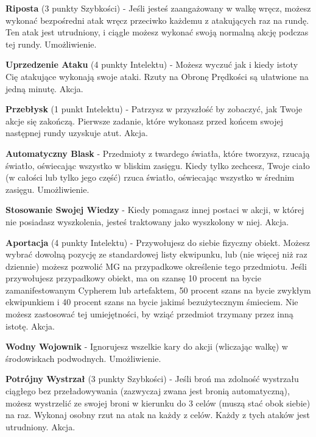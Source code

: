 \textbf{Riposta}\label{sec:Riposta} (3 punkty Szybkości) - Jeśli jesteś zaangażowany w walkę wręcz, możesz wykonać bezpośredni atak wręcz przeciwko każdemu z atakujących raz na rundę. Ten atak jest utrudniony, i ciągle możesz wykonać swoją normalną akcję podczas tej rundy. Umożliwienie.

\textbf{Uprzedzenie Ataku}\label{sec:Uprzedzenie Ataku} (4 punkty Intelektu) - Możesz wyczuć jak i kiedy istoty Cię atakujące wykonają swoje ataki. Rzuty na Obronę Prędkości są ułatwione na jedną minutę. Akcja.

\textbf{Przebłysk}\label{sec:Przebłysk} (1 punkt Intelektu) - Patrzysz w przyszłość by zobaczyć, jak Twoje akcje się zakończą. Pierwsze zadanie, które wykonasz przed końcem swojej następnej rundy uzyskuje atut. Akcja.

\textbf{Automatyczny Blask}\label{sec:Automatyczny Blask} - Przedmioty z twardego światła, które tworzysz, rzucają światło, oświecając wszystko w bliskim zasięgu. Kiedy tylko zechcesz, Twoje ciało (w całości lub tylko jego część) rzuca światło, oświecając wszystko w średnim zasięgu. Umożliwienie. 

\textbf{Stosowanie Swojej Wiedzy}\label{sec:Stosowanie Swojej Wiedzy} - Kiedy pomagasz innej postaci w akcji, w której nie posiadasz wyszkolenia, jesteś traktowany jako wyszkolony w niej. Akcja.

\textbf{Aportacja}\label{sec:Aportacja} (4 punkty Intelektu) - Przywołujesz do siebie fizyczny obiekt. Możesz wybrać dowolną pozycję ze standardowej listy ekwipunku, lub (nie więcej niż raz dziennie) możesz pozwolić MG na przypadkowe określenie tego przedmiotu. Jeśli przywołujesz przypadkowy obiekt, ma on szansę 10 procent na bycie zamanifestowanym Cypherem lub artefaktem, 50 procent szans na bycie zwykłym ekwipunkiem i 40 procent szans na bycie jakimś bezużytecznym śmieciem. Nie możesz zastosować tej umiejętności, by wziąć przedmiot trzymany przez inną istotę. Akcja.

\textbf{Wodny Wojownik}\label{sec:Wodny Wojownik} - Ignorujesz wszelkie kary do akcji (wliczając walkę) w środowiskach podwodnych. Umożliwienie. 

\textbf{Potrójny Wystrzał}\label{sec:Potrójny Wystrzał} (3 punkty Szybkości) - Jeśli broń ma zdolność wystrzału ciągłego bez przeładowywania (zazwyczaj zwana jest bronią automatyczną), możesz wystrzelić ze swojej broni w kierunku do 3 celów (muszą stać obok siebie) na raz. Wykonaj osobny rzut na atak na każdy z celów. Każdy z tych ataków jest utrudniony. Akcja.

